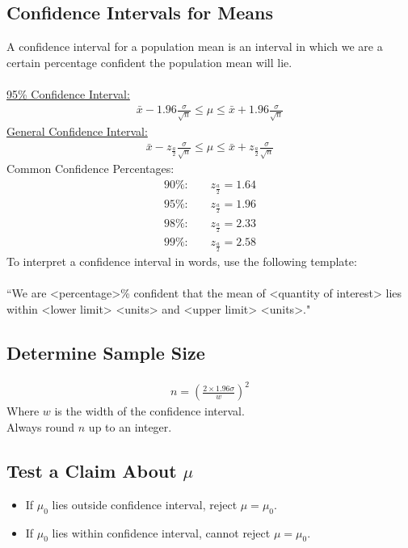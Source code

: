 \documentclass[10pt, a4paper, titlepage]{article}
\begin{document}
\begin{multicols*}{3}
	\subsection{Confidence Intervals for Means}
	A confidence interval for a population mean is an interval in which we are a certain percentage confident the population mean will lie.\\\\
	\underline{95\% Confidence Interval:}
	\begin{align}
		\bar{x}-1.96\frac{\sigma}{\sqrt{n}}\leq \mu \leq \bar{x}+1.96\frac{\sigma}{\sqrt{n}}
	\end{align}
	\underline{General Confidence Interval:}
	\begin{align}
		\bar{x}-z_{\frac{a}{2}}\frac{\sigma}{\sqrt{n}}\leq \mu \leq \bar{x}+z_{\frac{a}{2}}\frac{\sigma}{\sqrt{n}}
	\end{align}
	Common Confidence Percentages:
	\begin{align}
		\text{90\%:}\qquad z_{\frac{a}{2}}=1.64\\
		\text{95\%:}\qquad z_{\frac{a}{2}}=1.96\\
		\text{98\%:}\qquad z_{\frac{a}{2}}=2.33\\
		\text{99\%:}\qquad z_{\frac{a}{2}}=2.58
	\end{align}
	To interpret a confidence interval in words, use the following template:\\\\
	``We are \textless{}percentage\textgreater{}\% confident that the mean of \textless{}quantity of interest\textgreater{} lies within \textless{}lower limit\textgreater{} \textless{}units\textgreater{} and \textless{}upper limit\textgreater{} \textless{}units\textgreater{}."\\

	\dotfill
	\subsection{Determine Sample Size}
	\begin{align}
		n=\left(\frac{2\times 1.96\sigma}{w}\right)^2
	\end{align}
	Where $w$ is the width of the confidence interval.\\
	Always round $n$ up to an integer.\\

	\dotfill
	\subsection{Test a Claim About $\mu$}
	\begin{itemize}
		\item If $\mu _0$ lies outside confidence interval, reject $\mu =\mu _0$.
		\item If $\mu _0$ lies within confidence interval, cannot reject $\mu =\mu _0$.
	\end{itemize}


\end{multicols*}
\end{document}

